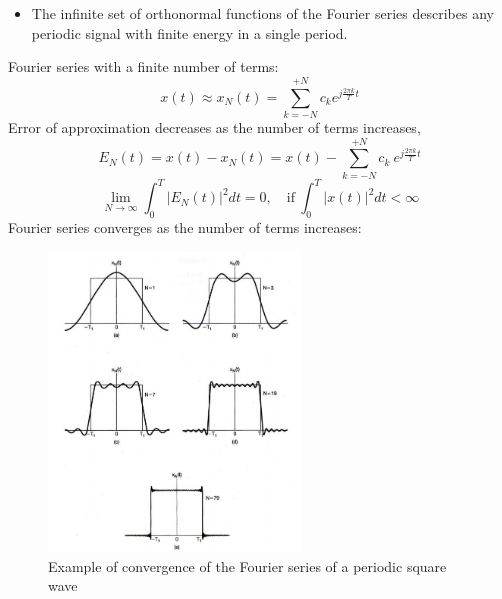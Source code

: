 \begin{itemize}
    \item The infinite set of orthonormal functions of the Fourier series describes any periodic signal with finite energy in a single period.
\end{itemize}

\begin{tcolorbox}[breakable]
Fourier series with a finite number of terms:
\[ x(t) \approx x_{N}(t) = \sum_{k=-N}^{+N} c_{k} e^{j\frac{2\pi k}{T}t} \]
Error of approximation decreases as the number of terms increases,
\[ E_{N}(t) = x(t)-x_{N}(t) = x(t)- \sum_{k=-N}^{+N} c_{k} \ e^{j\frac{2\pi k}{T}t} \]
\[ \lim_{N \to \infty} \int_{0}^{T} \lvert E_{N}(t) \rvert^{2} dt = 0, \quad \text{if} \ \int_{0}^{T} \lvert x(t) \rvert^{2} dt < \infty \] 
Fourier series converges as the number of terms increases:
\begin{figure}[H]
    \centering
    \includegraphics[width = 0.6\textwidth]{images/convergence}
    \caption{Example of convergence of the Fourier series of a periodic square wave} 
\end{figure}
\end{tcolorbox}

